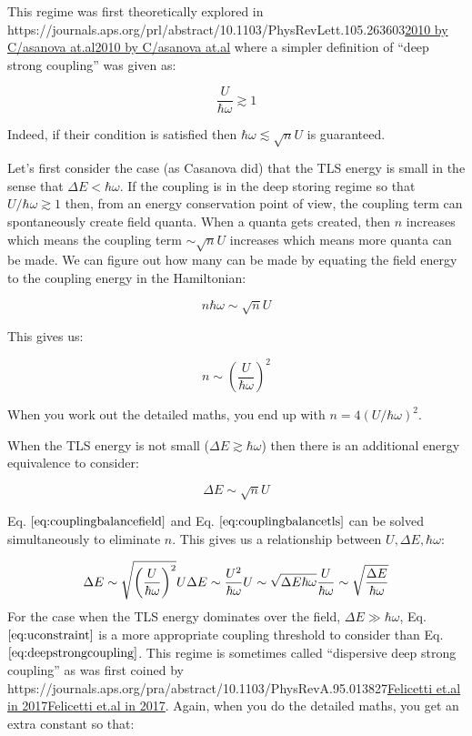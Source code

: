\documentclass[
]{article}
\let\oldhref\href
\renewcommand{\href}[2]{\ifx#1\urlprefix\oldhref{#1}{#2}\else\uline{\oldhref{#1}{#2}}\fi}
\renewcommand{\[}{\begin{equation}}
\renewcommand{\]}{\end{equation}}
\begin{document}
This regime was first theoretically explored in
\href{https://journals.aps.org/prl/abstract/10.1103/PhysRevLett.105.263603}{2010
by C/asanova at.al} where a simpler definition of ``deep strong
coupling'' was given as:

\[
\frac{U}{\hbar\omega} \gtrsim 1
\label{eq:deepstrongcoupling}
\]

Indeed, if their condition is satisfied then
\(\hbar \omega \lesssim \sqrt{n}U\) is guaranteed.

Let's first consider the case (as Casanova did) that the TLS energy is
small in the sense that \(\Delta E < \hbar \omega\). If the coupling is
in the deep storing regime so that \(U/\hbar\omega \gtrsim 1\) then,
from an energy conservation point of view, the coupling term can
spontaneously create field quanta. When a quanta gets created, then
\(n\) increases which means the coupling term \(\sim \sqrt{n}U\)
increases which means more quanta can be made. We can figure out how
many can be made by equating the field energy to the coupling energy in
the Hamiltonian:

\[
n\hbar\omega \sim \sqrt{n}U
\label{eq:couplingbalancefield}
\]

This gives us:

\[
n \sim \left(\frac{U}{\hbar\omega}\right)^2
\label{eq:selfconsistentn}
\]

When you work out the detailed maths, you end up with
\(n = 4(U/\hbar\omega)^2\).

When the TLS energy is not small (\(\Delta E \gtrsim \hbar \omega\))
then there is an additional energy equivalence to consider:

\[
\Delta E \sim \sqrt{n}U
\label{eq:couplingbalancetls}
\]

Eq. \(\ref{eq:couplingbalancefield}\) and Eq.
\(\ref{eq:couplingbalancetls}\) can be solved simultaneously to
eliminate \(n\). This gives us a relationship between
\(U,\Delta E,\hbar\omega\):

\[
\Delta E \sim \sqrt{\left(\frac{U}{\hbar\omega}\right)^2}U \\
\Delta E\sim \frac{U^2}{\hbar\omega} \\
U \sim \sqrt{\Delta E \hbar\omega} \\
\frac{U}{\hbar\omega} \sim \sqrt{\frac{\Delta E}{\hbar\omega}}
\label{eq:uconstraint}
\] For the case when the TLS energy dominates over the field,
\(\Delta E \gg \hbar \omega\), Eq. \(\ref{eq:uconstraint}\) is a more
appropriate coupling threshold to consider than Eq.
\(\ref{eq:deepstrongcoupling}\). This regime is sometimes called
``dispersive deep strong coupling'' as was first coined by
\href{https://journals.aps.org/pra/abstract/10.1103/PhysRevA.95.013827}{Felicetti
et.al in 2017}. Again, when you do the detailed maths, you get an extra
constant so that:
\end{document}
